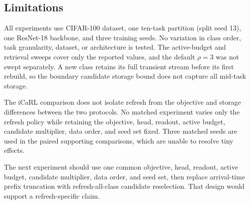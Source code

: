 \subsection{Limitations}
\label{subsec:limitations}

All experiments use CIFAR-100 dataset, one ten-task partition (split seed 13), one
ResNet-18 backbone, and three training seeds.  No variation in class order,
task granularity, dataset, or architecture is tested.  The active-budget and
retrieval sweeps cover only the reported values, and the default $\rho=3$ was
not swept separately.  A new class retains its full transient stream before
its first rebuild, so the boundary candidate storage bound does not capture all
mid-task storage.

The iCaRL comparison does not isolate refresh from the objective and storage
differences between the two protocols.  No matched experiment varies only the refresh policy while retaining the objective, head, readout, active budget, candidate multiplier, data order, and seed set fixed.  Three matched seeds are used in the paired supporting comparisons, which are unable to resolve tiny effects.

The next experiment should use one common objective, head, readout, active
budget, candidate multiplier, data order, and seed set, then replace
arrival-time prefix truncation with refresh-all-class candidate reselection.
That design would support a refresh-specific claim.
